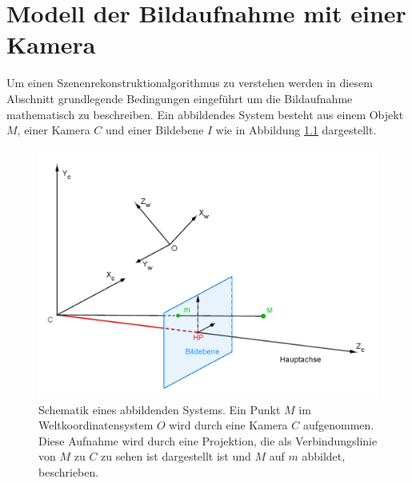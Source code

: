 \chapter{Modell der Bildaufnahme mit einer Kamera }
\label{sec:CameraModels}

Um einen Szenenrekonstruktionalgorithmus zu verstehen werden in diesem Abschnitt grundlegende  Bedingungen eingeführt um die Bildaufnahme mathematisch zu beschreiben. Ein abbildendes System besteht aus einem Objekt $M$, einer Kamera $C$ und einer Bildebene $I$ wie in Abbildung \ref{fig:PinholeCamera3D} dargestellt.\\



\begin{figure}[!htb]
	\centering
	\includegraphics[width=.8\linewidth]{images/PinholeCameraModell3D.png}
	\caption[Lochkameramodell]{Schematik eines abbildenden Systems. Ein Punkt $M$ im  Weltkoordinatensystem $O$ wird durch eine Kamera $C$ aufgenommen. Diese Aufnahme wird durch eine Projektion, die als Verbindungslinie von $M$ zu $C$ zu sehen ist dargestellt ist und $M$ auf $m$ abbildet, beschrieben.}
	\label{fig:PinholeCamera3D}
\end{figure}



